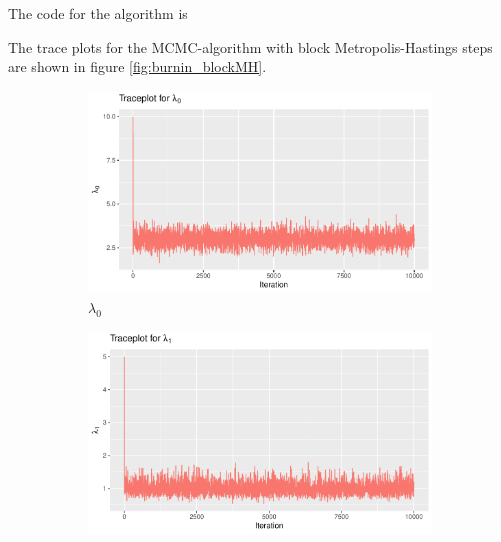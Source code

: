 


The code for the algorithm is 








The trace plots for the MCMC-algorithm with block Metropolis-Hastings steps are shown in figure \ref{fig:burnin_blockMH}. 

\begin{figure}[h]
    \centering
    \begin{subfigure}[b]{0.49\textwidth}
        \centering
        \includegraphics[width = \textwidth]{Images/block_sim_lambda0.pdf}
        \caption{$\lambda_0$}
        \label{fig:block_burnin_lam0}
    \end{subfigure}
    \begin{subfigure}[b]{0.49\textwidth}
        \centering
        \includegraphics[width = \textwidth]{Images/block_sim_lambda1.pdf}

\end{subfigure}
\end{figure}
